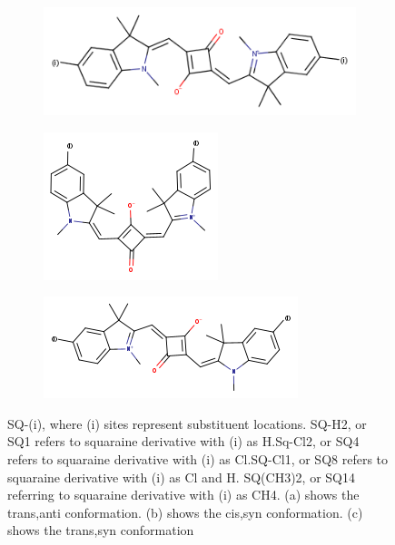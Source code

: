 \documentclass[journal=jacsat,manuscript=article]{achemso}
\begin{document}
\begin{figure}[h]
\begin{subfigure}{.45\textwidth}
    \centering
    \includegraphics[width=.8\linewidth]{figures/SQi.png}
    \caption{}
\end{subfigure}
\begin{subfigure}{.45\textwidth}
    \centering
    \includegraphics[width=.5\linewidth]{figures/sqi-cis.png}
    \caption{}
\end{subfigure}
\begin{subfigure}{.65\textwidth}
    \centering
    \includegraphics[width=.5\linewidth]{figures/sqi-trans.png}
    \caption{}
\end{subfigure}
    \caption{SQ-(i), where (i) sites represent substituent locations. SQ-H2, or SQ1 refers to squaraine derivative with (i) as H.Sq-Cl2, or SQ4 refers to squaraine derivative with (i) as Cl.SQ-Cl1, or SQ8 refers to squaraine derivative with (i) as Cl and H. SQ(CH3)2, or SQ14 referring to squaraine derivative with (i) as CH4. (a) shows the trans,anti conformation. (b) shows the cis,syn conformation. (c) shows the trans,syn conformation
}
    \label{fig:SQ dye}
\end{figure}


\end{document}
